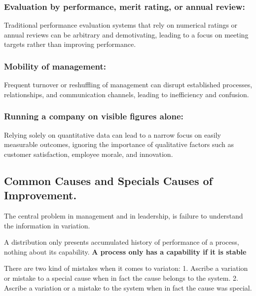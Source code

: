 \documentclass[11pt]{article}
\begin{document}
\hypertarget{evaluation-by-performance-merit-rating-or-annual-review}{%
\subsubsection{Evaluation by performance, merit rating, or annual
review:}\label{evaluation-by-performance-merit-rating-or-annual-review}}

Traditional performance evaluation systems that rely on numerical
ratings or annual reviews can be arbitrary and demotivating, leading to
a focus on meeting targets rather than improving performance.

\hypertarget{mobility-of-management}{%
\subsubsection{Mobility of management:}\label{mobility-of-management}}

Frequent turnover or reshuffling of management can disrupt established
processes, relationships, and communication channels, leading to
inefficiency and confusion.

\hypertarget{running-a-company-on-visible-figures-alone}{%
\subsubsection{Running a company on visible figures
alone:}\label{running-a-company-on-visible-figures-alone}}

Relying solely on quantitative data can lead to a narrow focus on easily
measurable outcomes, ignoring the importance of qualitative factors such
as customer satisfaction, employee morale, and innovation.

\hypertarget{common-causes-and-specials-causes-of-improvement.}{%
\subsection{Common Causes and Specials Causes of
Improvement.}\label{common-causes-and-specials-causes-of-improvement.}}

The central problem in management and in leadership, is failure to
understand the information in variation.

A distribution only presents accumulated history of performance of a
process, nothing about its capability. \textbf{A process only has a
capability if it is stable}

There are two kind of mistakes when it comes to variaton: 1. Ascribe a
variation or mistake to a special cause when in fact the cause belongs
to the system. 2. Ascribe a variation or a mistake to the system when in
fact the cause was special.
\end{document}
